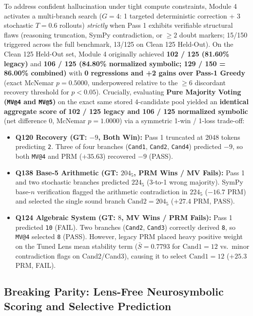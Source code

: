\documentclass[11pt,a4paper]{article}
\begin{document}
To address confident hallucination under tight compute constraints, Module 4 activates a multi-branch search ($G=4$: 1 targeted deterministic correction + 3 stochastic $T=0.6$ rollouts) \textit{strictly} when Pass 1 exhibits verifiable structural flaws (reasoning truncation, SymPy contradiction, or $\ge 2$ doubt markers; 15/150 triggered across the full benchmark, 13/125 on Clean 125 Held-Out). On the Clean 125 Held-Out set, Module 4 originally achieved \textbf{102 / 125 (81.60\% legacy)} and \textbf{106 / 125 (84.80\% normalized symbolic; 129 / 150 = 86.00\% combined)} with \textbf{0 regressions and +2 gains over Pass-1 Greedy} (exact McNemar $p = 0.5000$, underpowered relative to the $\ge 6$ discordant recovery threshold for $p < 0.05$). Crucially, evaluating \textbf{Pure Majority Voting (\texttt{MV@4} and \texttt{MV@5})} on the exact same stored 4-candidate pool yielded an \textbf{identical aggregate score of 102 / 125 legacy and 106 / 125 normalized symbolic} (net difference 0, McNemar $p = 1.0000$) via a symmetric 1-win / 1-loss trade-off:
\begin{itemize}
    \item \textbf{Q120 Recovery (GT: $-9$, Both Win):} Pass 1 truncated at 2048 tokens predicting \texttt{2}. Three of four branches (\texttt{Cand1}, \texttt{Cand2}, \texttt{Cand4}) predicted $-9$, so both \texttt{MV@4} and PRM ($+35.63$) recovered $\boxed{-9}$ (PASS).
    \item \textbf{Q138 Base-5 Arithmetic (GT: $204_5$, PRM Wins / MV Fails):} Pass 1 and two stochastic branches predicted $224_5$ (3-to-1 wrong majority). SymPy base-$n$ verification flagged the arithmetic contradiction in $224_5$ ($-16.7$ PRM) and selected the single sound branch $\text{Cand2} = 204_5$ ($+27.4$ PRM, PASS).
    \item \textbf{Q124 Algebraic System (GT: $8$, MV Wins / PRM Fails):} Pass 1 predicted \texttt{10} (FAIL). Two branches (\texttt{Cand2}, \texttt{Cand3}) correctly derived \texttt{8}, so \texttt{MV@4} selected \texttt{8} (PASS). However, legacy PRM placed heavy positive weight on the Tuned Lens mean stability term ($\bar{S} = 0.7793$ for $\text{Cand1} = 12$ vs.\ minor contradiction flags on Cand2/Cand3), causing it to select $\text{Cand1} = 12$ ($+25.3$ PRM, FAIL).
\end{itemize}

\subsection{Breaking Parity: Lens-Free Neurosymbolic Scoring and Selective Prediction}
\end{document}
